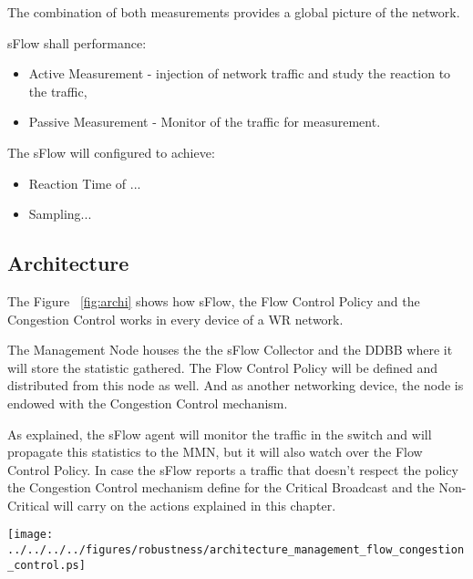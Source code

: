 \noindent The combination of both measurements provides a global picture of the
network.


\vspace{10 mm}

\noindent sFlow shall performance:

\begin{itemize}
	\item Active Measurement - injection of network traffic and study the
reaction to the traffic,
	\item Passive Measurement -  Monitor of the traffic for measurement.
\end{itemize}

\vspace{10 mm}

\noindent The sFlow will configured to achieve:
\begin{itemize}

	\item Reaction Time of ... 
	\item Sampling...
	
\end{itemize}




\subsection{Architecture}


The Figure ~\ref{fig:archi} shows how sFlow, the Flow Control Policy and the
Congestion Control works in every device of a WR network.

The Management Node houses the the sFlow Collector and the DDBB where it will
store the statistic gathered. The Flow Control Policy will be defined and
distributed from this node as well. And as another networking device, the node
is endowed with the Congestion Control mechanism.

As explained, the sFlow agent will monitor the traffic in the switch and will
propagate this statistics to the MMN, but it will also watch over the Flow
Control Policy. In case the sFlow reports a traffic that doesn't respect the
policy the Congestion Control mechanism define for the Critical Broadcast and
the Non-Critical will carry on the actions explained in this chapter.

\begin{center}

        \texttt{[image: ../../../../figures/robustness/architecture\_management\_flow\_congestion\_control.ps]}
		\label{fig:archi}
\end{center}




